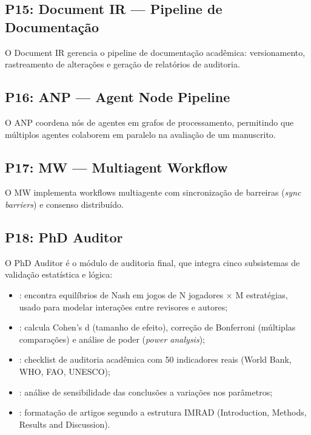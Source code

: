 \subsection{P15: Document IR — Pipeline de Documentação}

O Document IR gerencia o pipeline de documentação acadêmica:
versionamento, rastreamento de alterações e geração de relatórios
de auditoria.

\subsection{P16: ANP — Agent Node Pipeline}

O ANP coordena nós de agentes em grafos de processamento, permitindo
que múltiplos agentes colaborem em paralelo na avaliação de um
manuscrito.

\subsection{P17: MW — Multiagent Workflow}

O MW implementa workflows multiagente com sincronização de barreiras
(\textit{sync barriers}) e consenso distribuído.

\subsection{P18: PhD Auditor}

O PhD Auditor é o módulo de auditoria final, que integra cinco
subsistemas de validação estatística e lógica:

\begin{itemize}
\item {}: encontra equilíbrios de Nash em jogos
de N jogadores × M estratégias, usado para modelar interações entre
revisores e autores;
\item {}: calcula Cohen's d (tamanho de
efeito), correção de Bonferroni (múltiplas comparações) e análise
de poder (\textit{power analysis});
\item {}: checklist de auditoria acadêmica
com 50 indicadores reais (World Bank, WHO, FAO, UNESCO);
\item {}: análise de sensibilidade das
conclusões a variações nos parâmetros;
\item {}: formatação de artigos segundo a
estrutura IMRAD (Introduction, Methods, Results and Discussion).
\end{itemize}

